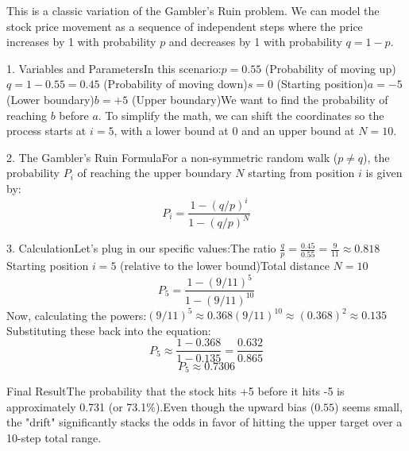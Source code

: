 \documentclass{report}
\begin{document}

\begin{sol}
    
    This is a classic variation of the Gambler's Ruin problem. We can model the stock price movement as a sequence of independent steps where the price increases by 1 with probability $p$ and decreases by 1 with probability $q = 1 - p$.
    
    1. Variables and ParametersIn this scenario:$p = 0.55$ (Probability of moving up)$q = 1 - 0.55 = 0.45$ (Probability of moving down)$s = 0$ (Starting position)$a = -5$ (Lower boundary)$b = +5$ (Upper boundary)We want to find the probability of reaching $b$ before $a$. To simplify the math, we can shift the coordinates so the process starts at $i = 5$, with a lower bound at $0$ and an upper bound at $N = 10$.
    
    2. The Gambler's Ruin FormulaFor a non-symmetric random walk ($p \neq q$), the probability $P_i$ of reaching the upper boundary $N$ starting from position $i$ is given by:$$P_i = \frac{1 - (q/p)^i}{1 - (q/p)^N}$$
    
    3. CalculationLet's plug in our specific values:The ratio $\frac{q}{p} = \frac{0.45}{0.55} = \frac{9}{11} \approx 0.818$Starting position $i = 5$ (relative to the lower bound)Total distance $N = 10$$$P_5 = \frac{1 - (9/11)^5}{1 - (9/11)^{10}}$$Now, calculating the powers:$(9/11)^5 \approx 0.368$$(9/11)^{10} \approx (0.368)^2 \approx 0.135$Substituting these back into the equation:$$P_5 \approx \frac{1 - 0.368}{1 - 0.135} = \frac{0.632}{0.865}$$$$P_5 \approx 0.7306$$
    
    Final ResultThe probability that the stock hits +5 before it hits -5 is approximately 0.731 (or 73.1\%).Even though the upward bias ($0.55$) seems small, the "drift" significantly stacks the odds in favor of hitting the upper target over a 10-step total range.

\end{sol}

\end{document}
